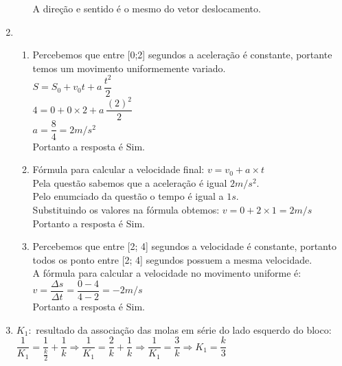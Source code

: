 \documentclass[a4paper, 12pt]{article}
\begin{document}
\begin{enumerate}
\begin{enumerate}
A direção e sentido é o mesmo do vetor deslocamento.

\end{enumerate}

\item \begin{enumerate}
	\item Percebemos que entre [0;2] segundos a aceleração é constante, portante temos um movimento uniformemente variado.\\
	
	$S = S_0 + v_0t + a\,\dfrac{t^2}{2}$\\
	$4 = 0 + 0 \times2 + a\,\dfrac{(2)^2}{2}$\\
	$a = \dfrac{8}{4} =  2 m/s^2$\\
	
	Portanto a resposta é Sim.\\
	
	\item Fórmula para calcular a velocidade final: $v = v_0 + a \times t$ \\
	Pela questão sabemos que a aceleração é igual $2 m/s^2$.\\
	Pelo enumciado da questão o tempo é igual a $1s$.\\
	Substituindo os valores na fórmula obtemos: $v = 0 + 2 \times 1 = 2 m/s$ \\
	
	Portanto a resposta é Sim. \\

	\item Percebemos que entre [2; 4] segundos a velocidade é constante, portanto todos os ponto entre [2; 4] segundos possuem a mesma velocidade.\\
	
	A fórmula para calcular a velocidade no movimento uniforme é:\\ $v = \dfrac{\Delta s}{\Delta t} =  \dfrac{0 - 4}{4 - 2} = -2m/s$ \\ 
	
		Portanto a resposta é Sim. \\
	

\end{enumerate}
 \item $K_1:$ resultado da associação das molas em série do lado esquerdo do bloco: \\
 
  $\dfrac{1}{K_1} = \dfrac{1}{\frac{k}{2}} + \dfrac{1}{k} \Rightarrow \dfrac{1}{K_1} = \dfrac{2}{k} + \dfrac{1}{k} \Rightarrow \dfrac{1}{K_1} = \dfrac{3}{k} \Rightarrow K_1 = \dfrac{k}{3}$\\
  

\end{enumerate}
\end{document}
